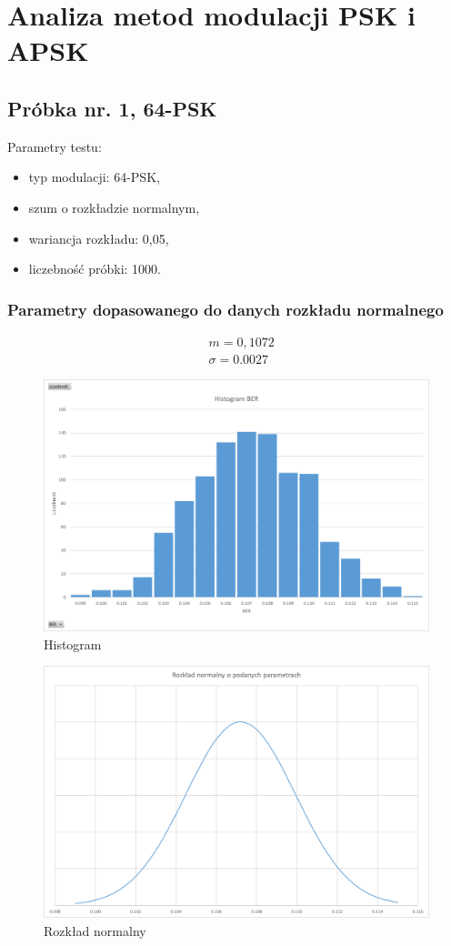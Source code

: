 \documentclass{article}
\begin{document}
\section{Analiza metod modulacji PSK i APSK}
	\subsection{Próbka nr. 1, 64-PSK}
		Parametry testu:
		\begin{itemize}
			\item typ modulacji: 64-PSK,
			\item szum o rozkładzie normalnym,
			\item wariancja rozkładu: 0,05,
			\item liczebność próbki: 1000.
		\end{itemize}
		
		\subsubsection{Parametry dopasowanego do danych rozkładu normalnego}
			\begin{align*}
				&m = 	0,1072\\
				&\sigma = 0.0027
			\end{align*}
		
			\begin{figure}[H]
				\centering
				\includegraphics[width=0.8\linewidth]{img/hist_64psk005.png}
				\caption{Histogram}
			\end{figure}
			\begin{figure}[H]
				\centering
				\includegraphics[width=0.8\linewidth]{img/rozk_64psk005.png}
				\caption{Rozkład normalny}
			\end{figure}
		
\end{document}
